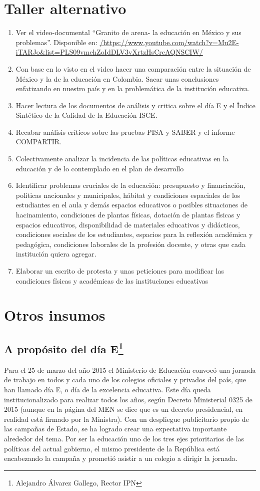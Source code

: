 \documentclass[10pt]{article}
\begin{document}
\section*{Taller alternativo}
\begin{enumerate}
\item Ver el video-documental “Granito de arena- la educación en México y sus problemas”. Disponible en: \url{/https://www.youtube.com/watch?v=Mu2E-iTARJo&list=PLS09vmehZoIdDLV3vXrtzHsCrcAQNSCIW/}
\item Con base en lo visto en el video hacer una comparación entre la situación de México y la de la educación en Colombia. Sacar unas conclusiones enfatizando en nuestro país y en la problemática de la institución educativa.
\item Hacer lectura de los documentos de análisis y critica sobre el día E y el Índice Sintético de la Calidad de la Educación ISCE.
\item Recabar análisis críticos sobre las pruebas PISA y SABER y el informe COMPARTIR.
\item Colectivamente analizar la incidencia de las políticas educativas en la educación y de lo contemplado en el plan de desarrollo
\item Identificar problemas cruciales de la educación: presupuesto y financiación, políticas nacionales y municipales, hábitat y condiciones espaciales de los estudiantes en el aula y demás espacios educativos o posibles situaciones de hacinamiento, condiciones de plantas físicas, dotación de plantas físicas y espacios educativos, disponibilidad de materiales educativos y didácticos, condiciones sociales de los estudiantes, espacios para la reflexión académica y pedagógica, condiciones laborales de la profesión docente, y otras que cada institución quiera agregar.
\item Elaborar un escrito de protesta y unas peticiones para modificar las condiciones físicas y académicas de las instituciones educativas
\end{enumerate}
\section*{Otros insumos}
\subsection*{A prop\'{o}sito del d\'{i}a E\footnote{Alejandro \'{A}lvarez Gallego, Rector IPN}}
Para el 25 de marzo del año 2015 el Ministerio de Educación convocó una jornada de trabajo en todos y cada uno de los colegios oficiales y privados del país, que han llamado día E, o día de la excelencia educativa. Este día queda institucionalizado para realizar todos los años, según Decreto Ministerial 0325 de 2015 (aunque en la página del MEN se dice que es un decreto presidencial, en realidad está firmado por la Ministra). Con un despliegue publicitario propio de las campañas de Estado, se ha logrado crear una expectativa importante alrededor del tema. Por ser la educación uno de los tres ejes prioritarios de las políticas del actual gobierno, el mismo presidente de la República está encabezando la campaña y prometió asistir a un colegio a dirigir la jornada.
\end{document}
